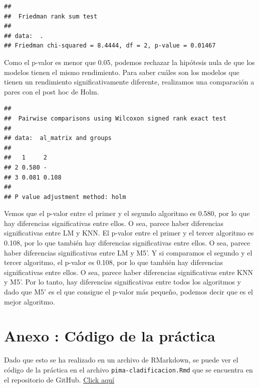 \documentclass[
]{article}
\begin{document}
\begin{verbatim}
## 
##  Friedman rank sum test
## 
## data:  .
## Friedman chi-squared = 8.4444, df = 2, p-value = 0.01467
\end{verbatim}

Como el p-valor es menor que 0.05, podemos rechazar la hipótesis nula de
que los modelos tienen el mismo rendimiento. Para saber cuáles son los
modelos que tienen un rendimiento significativamente diferente,
realizamos una comparación a pares con el post hoc de Holm.

\begin{verbatim}
## 
##  Pairwise comparisons using Wilcoxon signed rank exact test 
## 
## data:  al_matrix and groups 
## 
##   1     2    
## 2 0.580 -    
## 3 0.081 0.108
## 
## P value adjustment method: holm
\end{verbatim}

Vemos que el p-valor entre el primer y el segundo algoritmo es 0.580,
por lo que hay diferencias significativas entre ellos. O sea, parece
haber diferencias significativas entre LM y KNN. El p-valor entre el
primer y el tercer algoritmo es 0.108, por lo que también hay
diferencias significativas entre ellos. O sea, parece haber diferencias
significativas entre LM y M5'. Y si comparamos el segundo y el tercer
algoritmo, el p-valor es 0.108, por lo que también hay diferencias
significativas entre ellos. O sea, parece haber diferencias
significativas entre KNN y M5'. Por lo tanto, hay diferencias
significativas entre todos los algoritmos y dado que M5' es el que
consigue el p-valor más pequeño, podemos decir que es el mejor
algoritmo.

\hypertarget{anexo-cuxf3digo-de-la-pruxe1ctica}{%
\section{Anexo : Código de la
práctica}\label{anexo-cuxf3digo-de-la-pruxe1ctica}}

Dado que esto se ha realizado en un archivo de RMarkdown, se puede ver
el código de la práctica en el archivo \texttt{pima-cladificacion.Rmd}
que se encuentra en el repositorio de GitHub.
\href{https://github.com/DanelArias-Dreyton257/DATCOM-Intro/blob/main/anacalt-regresion.Rmd}{Click
aquí}
\end{document}
